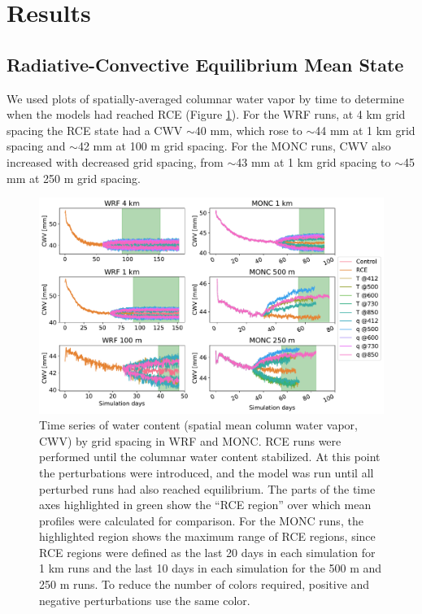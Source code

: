 \documentclass[draft]{agujournal2019}
\begin{document}
\section{Results}
\label{sec:results}

\subsection{Radiative-Convective Equilibrium Mean State}

We used plots of spatially-averaged columnar water vapor by time to determine
when the models had reached RCE (Figure \ref{fig:rce_pw}). For the WRF runs, at
4 km grid spacing the RCE state had a CWV $\sim$40 mm, which rose to $\sim$44 mm
at 1 km grid spacing and $\sim$42 mm at 100 m grid spacing. For the MONC runs,
CWV also increased with decreased grid spacing, from $\sim$43 mm at 1 km grid
spacing to $\sim$45 mm at 250 m grid spacing.

\begin{figure}[pth]
    \noindent\includegraphics[width=\textwidth]{figures/runs_timeseries.pdf}
    \caption{Time series of water content (spatial mean column water vapor, CWV)
    by grid spacing in WRF and MONC. RCE runs were performed until the columnar
    water content stabilized. At this point the perturbations were introduced,
    and the model was run until all perturbed runs had also reached equilibrium.
    The parts of the time axes highlighted in green show the ``RCE region'' over
    which mean profiles were calculated for comparison. For the MONC runs, the
    highlighted region shows the maximum range of RCE regions, since RCE regions
    were defined as the last 20 days in each simulation for 1 km runs and the
    last 10 days in each simulation for the 500 m and 250 m runs. To reduce the
    number of colors required, positive and negative perturbations use the same
    color.}
    \label{fig:rce_pw}
\end{figure}
\end{document}
